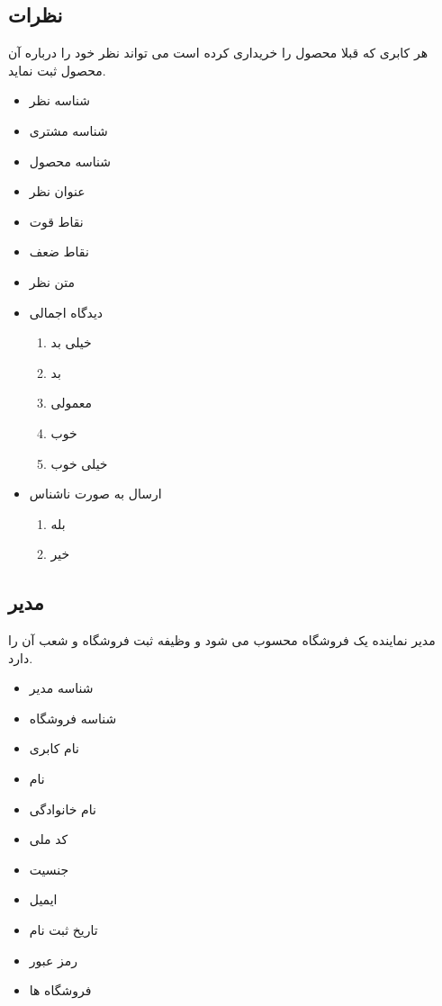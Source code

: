 \documentclass[]{article}
\begin{document}
\subsection{نظرات}
هر کابری که قبلا محصول را خریداری کرده است می تواند نظر خود را درباره آن محصول ثبت نماید.
\begin{itemize}
\item شناسه نظر
\item شناسه مشتری
\item شناسه محصول
\item عنوان نظر
\item نقاط قوت  
\item نقاط ضعف
\item متن نظر
\item دیدگاه اجمالی
\begin{enumerate}
\item خیلی بد
\item بد
\item معمولی
\item  خوب
\item  خیلی خوب
\end{enumerate}
\item ارسال به صورت ناشناس
\begin{enumerate}
\item بله
\item خیر
\end{enumerate}
\end{itemize}





\subsection{مدیر}
مدیر نماینده یک فروشگاه محسوب می شود و وظیفه ثبت فروشگاه و شعب آن را دارد.
\begin{itemize}
\item شناسه مدیر
\item شناسه فروشگاه
\item نام کابری
\item نام
\item نام خانوادگی
\item کد ملی
\item جنسیت
\item ایمیل
\item تاریخ ثبت نام
\item رمز عبور 
\item فروشگاه ها
\end{itemize}
\end{document}
